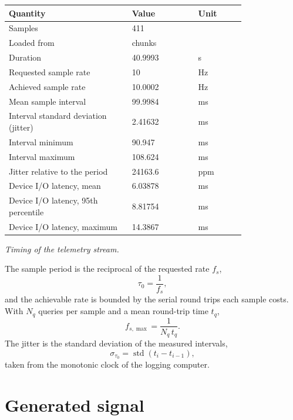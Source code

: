 \documentclass[11pt]{article}
\begin{document}
\begin{center}
\begin{tabular}{@{}p{0.52\linewidth}p{0.28\linewidth}l@{}}
\toprule
\textbf{Quantity} & \textbf{Value} & \textbf{Unit} \\
\midrule
Samples & 411 &  \\
Loaded from & chunks &  \\
Duration & 40.9993 & s \\
Requested sample rate & 10 & Hz \\
Achieved sample rate & 10.0002 & Hz \\
Mean sample interval & 99.9984 & ms \\
Interval standard deviation (jitter) & 2.41632 & ms \\
Interval minimum & 90.947 & ms \\
Interval maximum & 108.624 & ms \\
Jitter relative to the period & 24163.6 & ppm \\
Device I/O latency, mean & 6.03878 & ms \\
Device I/O latency, 95th percentile & 8.81754 & ms \\
Device I/O latency, maximum & 14.3867 & ms \\
\bottomrule
\end{tabular}

\emph{Timing of the telemetry stream.}
\end{center}

The sample period is the reciprocal of the requested rate $f_s$,
\begin{equation}
  \tau_0 = \frac{1}{f_s},
\end{equation}
and the achievable rate is bounded by the serial round trips each sample
costs. With $N_q$ queries per sample and a mean round-trip time $t_q$,
\begin{equation}
  f_{s,\max} = \frac{1}{N_q\,t_q}.
\end{equation}
The jitter is the standard deviation of the measured intervals,
\begin{equation}
  \sigma_{\tau_0} = \operatorname{std}\left(t_i - t_{i-1}\right),
\end{equation}
taken from the monotonic clock of the logging computer.

\section{Generated signal}
\end{document}
